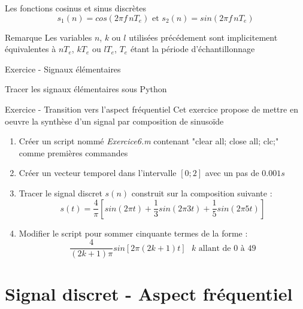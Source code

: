 \documentclass{beamer}
\newcounter{exampleBlockCounter}
\begin{document}
\begin{frame}
\begin{block}{Les fonctions cosinus et sinus discrètes}
	\[
		s_1(n) = cos(2\pi f \,  nT_e)\text{ et }s_2(n) = sin(2\pi f \, nT_e)
	\]
\end{block}

\begin{alertblock}{Remarque}
\justifying
Les variables $n$, $k$ ou $l$ utilisées précédement sont implicitement
équivalentes à $nT_e$, $kT_e$ ou $lT_e$, $T_e$ étant la période d'échantillonnage 
\end{alertblock} 
\pause
\begin{exampleblock}{Exercice  - Signaux élémentaires}\justifying 
\itemize
	\item Tracer les signaux élémentaires sous Python %
\end{exampleblock}
\end{frame}  
\begin{frame} 
	\begin{exampleblock}{Exercice  - Transition vers l'aspect fréquentiel}
	\justifying Cet exercice propose de mettre en oeuvre la synthèse d'un signal
	par composition de sinusoïde
		\begin{enumerate}
		 	\item Créer un script nommé \textit{Exercice6.m} contenant "clear all;
		 	close all; clc;" comme premières commandes
			\item Créer un vecteur temporel dans l'intervalle $[0;2]$ avec un pas de
			  $0.001s$ 
			\item Tracer le signal discret $s(n)$ construit sur la composition suivante :
			\[ 
			s(t) = \frac{4}{\pi}[sin(2\pi t) + \frac{1}{3}sin(2\pi 3 t) +
			\frac{1}{5}sin(2\pi 5 t)]
			\] 
			\item Modifier le script pour sommer cinquante termes de la forme :
			\[
			\frac{4}{(2k+1)\pi}sin[2\pi (2k+1)t]\text{ $k$ allant de $0$ à  $49$}
			\] 
		\end{enumerate}
	\end{exampleblock}
\end{frame}
\section{Signal discret - Aspect fréquentiel}
\end{document}
